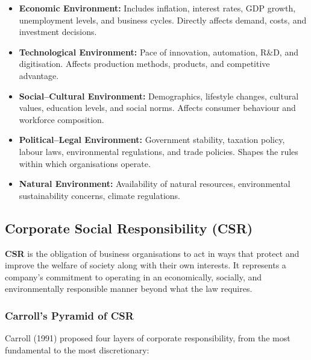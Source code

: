 \documentclass[12pt,a4paper]{article}
\begin{document}
\begin{itemize}[leftmargin=*, itemsep=3pt]
  \item \textbf{Economic Environment:} Includes inflation, interest rates, GDP growth, unemployment levels, and business cycles. Directly affects demand, costs, and investment decisions.
  \item \textbf{Technological Environment:} Pace of innovation, automation, R\&D, and digitisation. Affects production methods, products, and competitive advantage.
  \item \textbf{Social--Cultural Environment:} Demographics, lifestyle changes, cultural values, education levels, and social norms. Affects consumer behaviour and workforce composition.
  \item \textbf{Political--Legal Environment:} Government stability, taxation policy, labour laws, environmental regulations, and trade policies. Shapes the rules within which organisations operate.
  \item \textbf{Natural Environment:} Availability of natural resources, environmental sustainability concerns, climate regulations.
\end{itemize}

\subsection{Corporate Social Responsibility (CSR)}

\begin{tcolorbox}[defbox, title={\textbf{Corporate Social Responsibility (CSR)}}]
\textbf{CSR} is the obligation of business organisations to act in ways that protect and improve the welfare of society along with their own interests. It represents a company's commitment to operating in an economically, socially, and environmentally responsible manner beyond what the law requires.
\end{tcolorbox}

\subsubsection{Carroll's Pyramid of CSR}
Carroll (1991) proposed four layers of corporate responsibility, from the most fundamental to the most discretionary:
\end{document}

